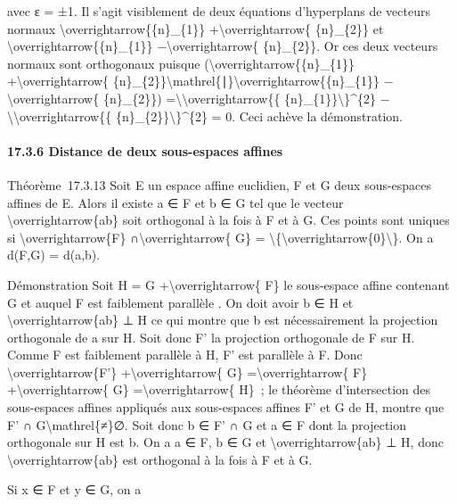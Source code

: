 \documentclass[]{article}
\begin{document}
avec ε = ±1. Il s'agit visiblement de deux équations d'hyperplans de
vecteurs normaux \textbackslash{}overrightarrow\{\{n\}\_\{1\}\}
+\textbackslash{}overrightarrow\{ \{n\}\_\{2\}\} et
\textbackslash{}overrightarrow\{\{n\}\_\{1\}\}
−\textbackslash{}overrightarrow\{ \{n\}\_\{2\}\}. Or ces deux vecteurs
normaux sont orthogonaux puisque
(\textbackslash{}overrightarrow\{\{n\}\_\{1\}\}
+\textbackslash{}overrightarrow\{
\{n\}\_\{2\}\}\textbackslash{}mathrel\{∣\}\textbackslash{}overrightarrow\{\{n\}\_\{1\}\}
−\textbackslash{}overrightarrow\{ \{n\}\_\{2\}\})
=\textbackslash{}\textbar{}\textbackslash{}overrightarrow\{\{
\{n\}\_\{1\}\}\textbackslash{}\textbar{}\}\^{}\{2\}
−\textbackslash{}\textbar{}\textbackslash{}overrightarrow\{\{
\{n\}\_\{2\}\}\textbackslash{}\textbar{}\}\^{}\{2\} = 0. Ceci achève la
démonstration.

\paragraph{17.3.6 Distance de deux sous-espaces affines}

Théorème~17.3.13 Soit E un espace affine euclidien, F et G deux
sous-espaces affines de E. Alors il existe a ∈ F et b ∈ G tel que le
vecteur \textbackslash{}overrightarrow\{ab\} soit orthogonal à la fois à
F et à G. Ces points sont uniques si \textbackslash{}overrightarrow\{F\}
∩\textbackslash{}overrightarrow\{ G\} =
\textbackslash{}\{\textbackslash{}overrightarrow\{0\}\textbackslash{}\}.
On a d(F,G) = d(a,b).

Démonstration Soit H = G +\textbackslash{}overrightarrow\{ F\} le
sous-espace affine contenant G et auquel F est faiblement parallèle . On
doit avoir b ∈ H et \textbackslash{}overrightarrow\{ab\} ⊥ H ce qui
montre que b est nécessairement la projection orthogonale de a sur H.
Soit donc F' la projection orthogonale de F sur H. Comme F est
faiblement parallèle à H, F' est parallèle à F. Donc
\textbackslash{}overrightarrow\{F'\} +\textbackslash{}overrightarrow\{
G\} =\textbackslash{}overrightarrow\{ F\}
+\textbackslash{}overrightarrow\{ G\} =\textbackslash{}overrightarrow\{
H\}~; le théorème d'intersection des sous-espaces affines appliqués aux
sous-espaces affines F' et G de H, montre que F' ∩
G\textbackslash{}mathrel\{≠\}∅. Soit donc b ∈ F' ∩ G et a ∈ F dont la
projection orthogonale sur H est b. On a a ∈ F, b ∈ G et
\textbackslash{}overrightarrow\{ab\} ⊥ H, donc
\textbackslash{}overrightarrow\{ab\} est orthogonal à la fois à F et à
G.

Si x ∈ F et y ∈ G, on a
\end{document}
